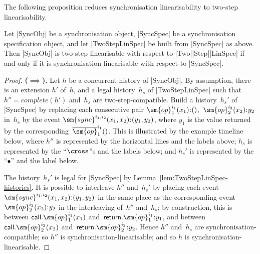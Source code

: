 The following proposition reduces synchronisation linearisability to two-step
linearisability.
%
\begin{prop}
Let |SyncObj| be a synchronisation object, |SyncSpec| be a synchronisation
specification object, and let |TwoStepLinSpec| be built from |SyncSpec| as
above.  Then |SyncObj| is two-step linearisable with respect to
|Two|\-|Step|\-|LinSpec| if and only if it is synchronisation linearisable
with respect to |SyncSpec|.
\end{prop}
\begin{proof}
\textbf{($\implies$).}\quad
%
Let $h$ be a concurrent history of |SyncObj|.  By assumption, there is an
extension $h'$ of~$h$, and a legal history~$h_s$ of |TwoStepLinSpec| such that
$h'' = complete(h')$ and~$h_s$ are two-step-compatible.
%
Build a history~$h_s'$ of |SyncSpec| by replacing each consecutive pair
$\sm{op}_1^{i_1}(x_1) \:: ()$,\, $\sm{op}_2^{i_2}(x_2) \:: y_2$ in~$h_s$ by
the event $\sm{sync}^{i_1,i_2}(x_1,x_2) \:: (y_1,y_2)$, where $y_1$ is the
value returned by the corresponding~$\overline{\sm{op}}_1^{i_1}()$.
%
This is illustrated by the example timeline below, where $h''$ is represented
by the horizontal lines and the labels above; $h_s$ is represented by the
``$\cross$''s and the labels below; and $h_s'$ is represented by the
``$\bullet$'' and the label below.
%
\begin{center}
\end{center}

The history~$h_s'$ is legal for |SyncSpec| by
Lemma~\ref{lem:TwoStepLinSpec-histories}.
%
It is possible to interleave $h''$ and~$h_s'$ by placing each event
$\sm{sync}^{i_1,i_2}(x_1,x_2) \:: (y_1,y_2)$ in the same place as the
corresponding event $\sm{op}_2^{i_2}(x_2) \:: y_2$ in the interleaving
of~$h''$ and~$h_s$; by construction, this is between
$\call.\sm{op}_1^{i_1}(x_1)$ and~$\return.\sm{op}_1^{i_1} \:: y_1$, and
between $\call.\sm{op}_2^{i_2}(x_2)$ and~$\return.\sm{op}_2^{i_2} \:: y_2$.
%
Hence $h''$ and~$h_s$ are synchronisation-compatible; so $h''$ is
synchronisation-linearisable; and so $h$ is synchronisation-linearisable.


\end{proof}
